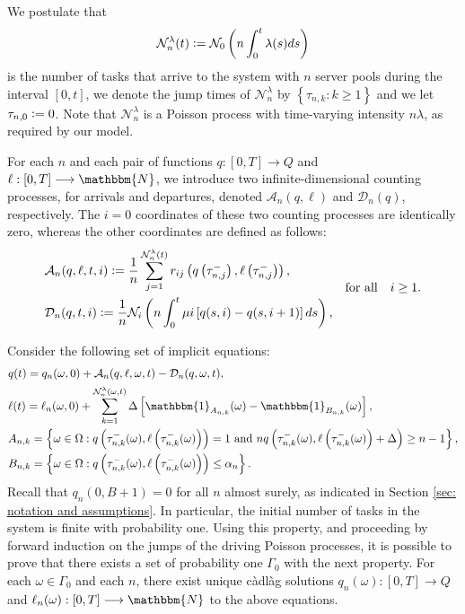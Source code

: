 \documentclass[a4paper, 12pt]{article}
\theoremstyle{definition}
\newcommand{\map}[3]{#1 : #2 \longrightarrow #3}
\newcommand{\set}[2]{\left\{#1 : #2\right\}}
\newcommand{\indc}[1]{\mathbbm{1}_{#1}}
\newcommand{\defeq}{\vcentcolon=}
\newcommand{\calA}{\mathcal{A}}
\newcommand{\calD}{\mathcal{D}}
\newcommand{\calN}{\mathcal{N}}
\newcommand{\N}{\mathbbm{N}}
\begin{document}
We postulate that
\begin{equation*}
	\calN_n^\lambda(t) \defeq \calN_0\left(n\int_0^t \lambda(s)ds\right)
\end{equation*}
is the number of tasks that arrive to the system with $n$ server pools during the interval $[0, t]$, we denote the jump times of $\calN_n^\lambda$ by $\set{\tau_{n,k}}{k \geq 1}$ and we let $\tau_{n,0} \defeq 0$. Note that $\calN_n^\lambda$ is a Poisson process with time-varying intensity $n\lambda$, as required by our model.

For each $n$ and each pair of functions $\map{q}{[0, T]}{Q}$ and $\map{\ell}{[0, T]}{\N}$, we introduce two infinite-dimensional counting processes, for arrivals and departures, denoted $\calA_n(q, \ell)$ and $\calD_n(q)$, respectively. The $i = 0$ coordinates of these two counting processes are identically zero, whereas the other coordinates are defined as follows:
\begin{equation*}
	\begin{split}
		&\calA_n(q, \ell, t, i) \defeq \frac{1}{n} \sum_{j = 1}^{\calN_n^\lambda(t)} r_{ij}\left(q\left(\tau_{n, j}^-\right), \ell\left(\tau_{n, j}^-\right)\right), \\
		&\calD_n(q, t, i) \defeq \frac{1}{n} \calN_i\left(n\int_0^t \mu i \left[q(s, i) - q(s, i + 1)\right]ds\right),
	\end{split}
	\quad \text{for all} \quad i \geq 1.
\end{equation*}

Consider the following set of implicit equations:
\begin{align*}
	&q(t) = q_n(\omega, 0) + \calA_n(q, \ell, \omega, t) - \calD_n(q, \omega, t), \\
	&\ell(t) = \ell_n(\omega, 0) + \sum_{k = 1}^{\calN_n^\lambda(\omega, t)} \Delta\left[\indc{A_{n, k}}(\omega) - \indc{B_{n, k}}(\omega)\right], \\
	&A_{n, k} = \set{\omega \in \Omega}{q\left(\tau_{n, k}^-(\omega), \ell\left(\tau_{n, k}^-(\omega)\right)\right) = 1\ \text{and}\ nq\left(\tau_{n, k}^-(\omega), \ell\left(\tau_{n, k}^-(\omega)\right) + \Delta\right) \geq n - 1}, \\
	&B_{n, k} = \set{\omega \in \Omega}{q\left(\tau_{n, k}^-(\omega), \ell\left(\tau_{n, k}^-(\omega)\right)\right) \leq \alpha_n}.
\end{align*}
Recall that $q_n(0, B + 1) = 0$ for all $n$ almost surely, as indicated in Section \ref{sec: notation and assumptions}. In particular, the initial number of tasks in the system is finite with probability one. Using this property, and proceeding by forward induction on the jumps of the driving Poisson processes, it is possible to prove that there exists a set of probability one $\Gamma_0$ with the next property. For each $\omega \in \Gamma_0$ and each $n$, there exist unique c\`adl\`ag solutions $\map{q_n(\omega)}{[0, T]}{Q}$ and $\map{\ell_n(\omega)}{[0, T]}{\N}$ to the above equations.
\end{document}

